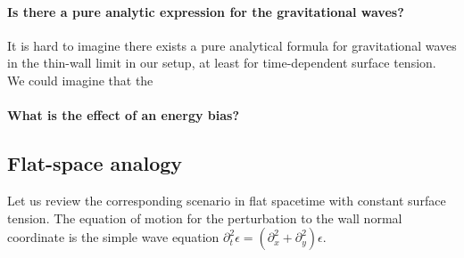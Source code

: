 \paragraph{Is there a pure analytic expression for the gravitational waves?} %
It is hard to imagine there exists a pure analytical formula for gravitational waves in the thin-wall limit in our setup, at least for time-dependent surface tension. We could imagine that the \blahblah {}

\paragraph{What is the effect of an energy bias?} %


\subsection{Flat-space analogy}
    Let us review the corresponding scenario in flat spacetime with constant surface tension. The equation of motion for the perturbation to the wall normal coordinate is the simple wave equation $\partial_t^2 \epsilon = (\partial_x^2 + \partial_y^2) \epsilon$. 


